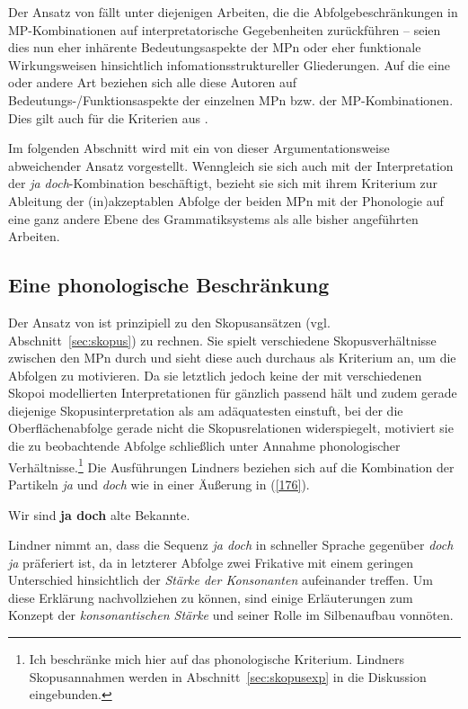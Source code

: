 Der Ansatz von \citet{Vriendt1991} fällt unter diejenigen Arbeiten, die die Abfolgebeschränkungen in MP-Kombinationen auf interpretatorische Gegebenheiten zurückführen – seien dies nun eher inhärente Bedeutungsaspekte der MPn oder eher funktionale Wirkungsweisen hinsichtlich infomationsstruktureller Gliederungen. Auf die eine oder andere Art beziehen sich alle diese Autoren auf Bedeutungs-/Funktionsaspekte der einzelnen MPn bzw. der MP-Kombinationen. Dies gilt auch für die Kriterien aus \citet{Thurmair1989, Thurmair1991}. 

Im folgenden Abschnitt wird mit \citet{Lindner1991} ein von dieser Argumentationsweise abweichender Ansatz vorgestellt. Wenngleich sie sich auch mit der Interpretation der \textit{ja doch}-Kombination beschäftigt, bezieht sie sich mit ihrem Kriterium zur Ableitung der (in)akzeptablen Abfolge der beiden MPn mit der Phonologie auf eine ganz andere Ebene des Grammatiksystems als alle bisher angeführten Arbeiten.

\subsection{Eine phonologische Beschränkung}
\label{sec:phon}
Der Ansatz von \citet{Lindner1991} ist prinzipiell zu den Skopusansätzen (vgl. Abschnitt~\ref{sec:skopus}) zu rechnen. Sie spielt verschiedene Skopusverhältnisse  zwischen den MPn durch und sieht diese auch durchaus als Kriterium an, um die Abfolgen zu motivieren. Da sie letztlich jedoch keine der mit verschiedenen Skopoi modellierten Interpretationen für gänzlich passend hält und zudem gerade diejenige Skopusinterpretation als am adäquatesten einstuft, bei der die Oberflächenabfolge gerade nicht die Skopusrelationen widerspiegelt, motiviert sie die zu beobachtende Abfolge schließlich unter Annahme phonologischer Verhältnisse.\footnote{Ich beschränke mich hier auf das phonologische Kriterium. Lindners Skopusannahmen werden in Abschnitt~\ref{sec:skopusexp} in die Diskussion eingebunden.} Die Ausführungen Lindners beziehen sich auf die Kombination der Partikeln \textit{ja} und \textit{doch} wie in einer Äußerung in (\ref{176}).

\begin{exe}
	\ex\label{176} 
	Wir sind \textbf{ja doch} alte Bekannte.
\end{exe}
Lindner nimmt an, dass die Sequenz \textit{ja doch} in schneller Sprache gegenüber \textit{doch ja} präferiert ist, da in letzterer Abfolge zwei Frikative mit einem geringen Unterschied hinsichtlich der \textit{Stärke der Konsonanten}  aufeinander treffen. Um diese Erklärung nachvollziehen zu können, sind einige Erläuterungen zum Konzept der \textit{konsonantischen Stärke} und seiner Rolle im Silbenaufbau vonnöten.

